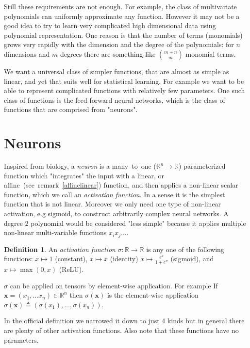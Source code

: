 \documentclass[11pt, a4paper]{report}
\theoremstyle{plain}
\theoremstyle{definition}
\newtheorem{mydef}{Definition}[chapter]
\theoremstyle{remark}
\newcommand{\R}{\mathbb{R}}
\newcommand{\x}{\mathbf{x}}
\begin{document}
Still these requirements are not enough. For example, the class of multivariate
polynomials can uniformly approximate any function. However it may not be a good
idea to try to learn very complicated high dimensional data using polynomial
representation. One reason is that the number of terms (monomials) grows very
rapidly with the dimension and the degree of the polynomials: for $n$ dimensions
and $m$ degrees there are something like $\binom{m + n}{m}$ monomial terms.

We want a universal class of simpler functions, that are almost as simple as
linear, and yet that suits well for statistical learning. For example we want to
be able to represent complicated functions with relatively few parameters. One
such class of functions is the feed forward neural networks, which is the class
of functions that are comprised from "neurons".

\section{Neurons}

Inspired from biology, a \emph{neuron} is a many--to--one ($\R^n \to \R$)
parameterized function which "integrates" the input with a linear, or
affine~(see~remark~\ref{affinelinear}) function, and then applies a non-linear
scalar function, which we call an \emph{activation function}. In a sense it is
the simplest function that is not linear. Moreover we only need one type of
non-linear activation, e.g sigmoid, to construct arbitrarily complex neural
networks. A degree 2 polynomial would be considered "less simple" because it
applies multiple non-linear multi-variable functions $x_i x_j\dots$.

\begin{mydef}
\label{def:activationfunction}
An \emph{activation function} $\sigma : \R \to \R$ is any one of the following
functions: $x \mapsto 1$ (constant), $x \mapsto x$ (identity) $ x \mapsto
\frac{e^x}{1 + e^x}$ (sigmoid), and $x \mapsto \max(0,x)$ (ReLU).

$\sigma$ can be applied on tensors by element-wise application. For example If
$\x = (x_1, \dots x_n) \in \R^n$ then $\sigma(\x)$ is the element-wise
application $\sigma(\x) \triangleq (\sigma(x_1), \dots , \sigma(x_n))$.
\end{mydef}

In the official definition we narrowed it down to just 4 kinds but in general
there are plenty of other activation functions. Also note that these functions
have no parameters.
\end{document}
